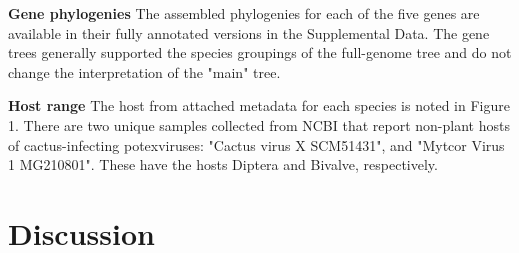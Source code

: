 \documentclass{article}
\begin{document}
\textbf{Gene phylogenies}
The assembled phylogenies for each of the five genes are available in their fully annotated versions in the Supplemental Data. 
The gene trees generally supported the species groupings of the full-genome tree and do not change the interpretation of the "main" tree. 

\textbf{Host range }
The host from attached metadata for each species is noted in Figure 1. 
There are two unique samples collected from NCBI that report non-plant hosts of cactus-infecting potexviruses: "Cactus virus X SCM51431", and "Mytcor Virus 1 MG210801". 
These have the hosts Diptera and Bivalve, respectively. 

\section*{Discussion}


\medskip


\end{document}
